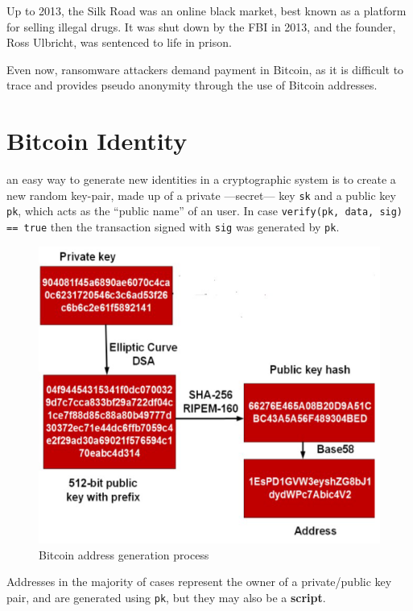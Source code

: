 Up to 2013, the Silk Road was an online black market, best known as a platform for selling illegal drugs. It was shut down by the FBI in 2013, and the founder, Ross Ulbricht, was sentenced to life in prison.

Even now, ransomware attackers demand payment in Bitcoin, as it is difficult to trace and provides pseudo anonymity through the use of Bitcoin addresses.

\section{Bitcoin Identity}
an easy way to generate new identities in a cryptographic system is to create a new random key-pair, made up of a private ---secret--- key \texttt{sk} and a public key \texttt{pk}, which acts as the ``public name'' of an user.
In case  \texttt{verify(pk, data, sig) == true} then the transaction signed with \texttt{sig} was generated by \texttt{pk}. 

\begin{figure}[htbp]
   \centering
   \includegraphics{images/bitcoin_addressgen.png}
   \caption{Bitcoin address generation process}
   \label{fig:bitcoin_addressgen}
\end{figure}

Addresses in the majority of cases represent the owner of a private/public key pair, and are generated using \texttt{pk}, but they may also be a \textbf{script}.

